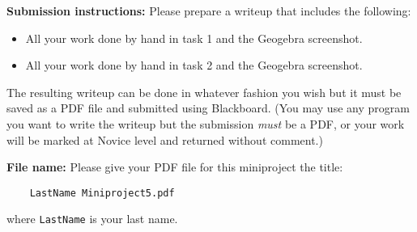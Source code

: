 \documentclass[11pt,letterpaper]{article}
\begin{document}
\hrulefill

\noindent
\textbf{Submission instructions:} Please prepare a writeup that includes the following: 
	\begin{itemize}
		\item All your work done by hand in task 1 and the Geogebra screenshot.  
		\item All your work done by hand in task 2 and the Geogebra screenshot.
	\end{itemize}
The resulting writeup can be done in whatever fashion you wish but it must be saved as a PDF file and submitted using Blackboard. (You may use any program you want to write the writeup but the submission \emph{must} be a PDF, or your work will be marked at Novice level and returned without comment.) 

\noindent
\textbf{File name:} Please give your PDF file for this miniproject the title: 
\begin{verbatim}
	LastName Miniproject5.pdf
\end{verbatim}
where \texttt{LastName} is your last name. 
\end{document}

